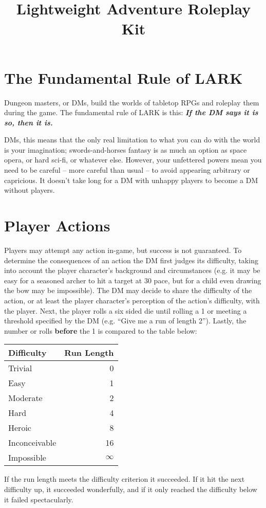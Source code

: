 \documentclass[12pt]{article}
\title{Lightweight Adventure Roleplay Kit}
\begin{document}
\setlength{\droptitle}{-100pt}
\predate{}
\date{}
\postdate{}
\preauthor{}
\author{}
\postauthor{}
\maketitle

\section{The Fundamental Rule of LARK}

Dungeon masters, or DMs, build the worlds of tabletop RPGs and
roleplay them during the game. The fundamental rule of LARK is this:
\emph{\textbf{If the DM says it is so, then it is.}}

DMs, this means that the only real limitation to what you can do with
the world is your imagination; swords-and-horses fantasy is as much an
option as space opera, or hard sci-fi, or whatever else. However, your
unfettered powers mean you need to be careful -- more careful than
usual -- to avoid appearing arbitrary or capricious. It doesn't take
long for a DM with unhappy players to become a DM without players.

\section{Player Actions} Players may attempt any action in-game, but
success is not guaranteed. To determine the consequences of an action
the DM first judges its difficulty, taking into account the player
character's background and circumstances (e.g. it may be easy for a
seasoned archer to hit a target at 30 pace, but for a child even
drawing the bow may be impossible). The DM may decide to share the
difficulty of the action, or at least the player character's
perception of the action's difficulty, with the player. Next, the
player rolls a six sided die until rolling a 1 or meeting a threshold
specified by the DM (e.g. ``Give me a run of length 2''). Lastly, the
number or rolls \textbf{before} the 1 is compared to the table below:

\begin{center} 
  \begin{tabular}{lr}
    \toprule
    \textbf{Difficulty} & \textbf{Run Length} \\ \midrule
    Trivial       & 0 \\
    Easy          & 1 \\
    Moderate      & 2 \\
    Hard          & 4 \\
    Heroic        & 8 \\
    Inconceivable & 16 \\
    Impossible    & $\infty$ \\ \bottomrule
  \end{tabular}
\end{center}

If the run length meets the difficulty criterion it succeeded. If it
hit the next difficulty up, it succeeded wonderfully, and if it only
reached the difficulty below it failed spectacularly.
\end{document}
